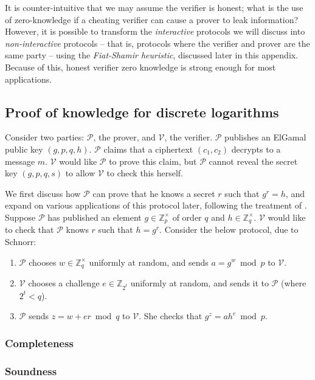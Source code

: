 \documentclass[11pt,twoside,a4paper]{article}
\theoremstyle{definition}
\begin{document}
It is counter-intuitive that we may assume the verifier is honest; what is the use of zero-knowledge if a cheating verifier can cause a prover to leak information? However, it is possible to transform the \textit{interactive} protocols we will discuss into \textit{non-interactive} protocols -- that is, protocols where the verifier and prover are the same party -- using the \textit{Fiat-Shamir heuristic}, discussed later in this appendix. Because of this, honest verifier zero knowledge is strong enough for most applications.
\subsection{Proof of knowledge for discrete logarithms}
Consider two parties: \(\mathcal{P}\), the prover, and \(\mathcal{V}\), the verifier. \(\mathcal{P}\) publishes an ElGamal public key \((g,p,q,h)\). \(\mathcal{P}\) claims that a ciphertext \((c_1, c_2)\) decrypts to a message \(m\). \(\mathcal{V}\) would like \(\mathcal{P}\) to prove this claim, but \(\mathcal{P}\) cannot reveal the secret key \((g,p,q,s)\) to allow \(\mathcal{V}\) to check this herself.

We first discuss how \(\mathcal{P}\) can prove that he knows a secret \(r\) such that \(g^r=h\), and expand on various applications of this protocol later, following the treatment of \cite{damgaard2002sigma}. Suppose \(\mathcal{P}\) has published an element \(g\in\mathbb{Z}^\times_p\) of order \(q\) and \(h\in\mathbb{Z}^\times_q\). \(\mathcal{V}\) would like to check that \(\mathcal{P}\) knows \(r\) such that \(h=g^r\). Consider the below protocol, due to Schnorr:
\begin{enumerate}
    \item \(\mathcal{P}\) chooses \(w\in\mathbb{Z}^\times_q\) uniformly at random, and sends \(a=g^w\bmod p\) to \(\mathcal{V}\).
    \item \(\mathcal{V}\) chooses a challenge \(e\in\mathbb{Z}_{2^t}\) uniformly at random, and sends it to \(\mathcal{P}\) (where \(2^t<q\)).
    \item \(\mathcal{P}\) sends \(z=w+er\bmod q\) to \(\mathcal{V}\). She checks that \(g^z=ah^e\bmod p\).
\end{enumerate}
\subsubsection{Completeness}
\subsubsection{Soundness}
\end{document}
